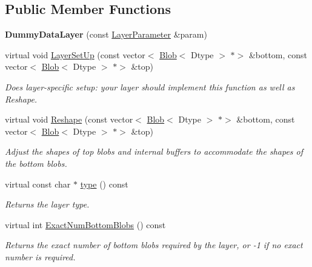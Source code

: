 \subsection*{Public Member Functions}
\begin{DoxyCompactItemize}
\item 
\mbox{\label{classcaffe_1_1_dummy_data_layer_a98568bcfa177c5eef82ebd0f50465c78}} 
{\bfseries Dummy\+Data\+Layer} (const \mbox{\hyperlink{classcaffe_1_1_layer_parameter}{Layer\+Parameter}} \&param)
\item 
virtual void \mbox{\hyperlink{classcaffe_1_1_dummy_data_layer_a43b495bfead8d18bf1d8eaf7bf91e3e4}{Layer\+Set\+Up}} (const vector$<$ \mbox{\hyperlink{classcaffe_1_1_blob}{Blob}}$<$ Dtype $>$ $\ast$$>$ \&bottom, const vector$<$ \mbox{\hyperlink{classcaffe_1_1_blob}{Blob}}$<$ Dtype $>$ $\ast$$>$ \&top)
\begin{DoxyCompactList}\small\item\em Does layer-\/specific setup\+: your layer should implement this function as well as Reshape. \end{DoxyCompactList}\item 
virtual void \mbox{\hyperlink{classcaffe_1_1_dummy_data_layer_ae72f2ea80339981bf925f0291f62d527}{Reshape}} (const vector$<$ \mbox{\hyperlink{classcaffe_1_1_blob}{Blob}}$<$ Dtype $>$ $\ast$$>$ \&bottom, const vector$<$ \mbox{\hyperlink{classcaffe_1_1_blob}{Blob}}$<$ Dtype $>$ $\ast$$>$ \&top)
\begin{DoxyCompactList}\small\item\em Adjust the shapes of top blobs and internal buffers to accommodate the shapes of the bottom blobs. \end{DoxyCompactList}\item 
\mbox{\label{classcaffe_1_1_dummy_data_layer_ac41023bacefdb067d6ab153f10e486d4}} 
virtual const char $\ast$ \mbox{\hyperlink{classcaffe_1_1_dummy_data_layer_ac41023bacefdb067d6ab153f10e486d4}{type}} () const
\begin{DoxyCompactList}\small\item\em Returns the layer type. \end{DoxyCompactList}\item 
virtual int \mbox{\hyperlink{classcaffe_1_1_dummy_data_layer_a73101a8ace6de2b179e36c13be17cb17}{Exact\+Num\+Bottom\+Blobs}} () const
\begin{DoxyCompactList}\small\item\em Returns the exact number of bottom blobs required by the layer, or -\/1 if no exact number is required. \end{DoxyCompactList}\item 

\end{DoxyCompactItemize}
